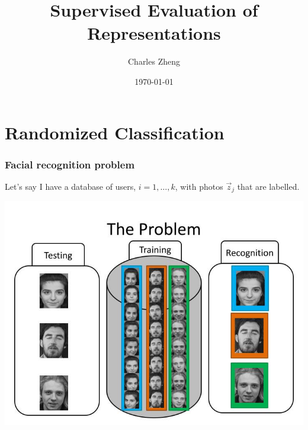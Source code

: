 \documentclass{beamer}
\title[Defense]{Supervised Evaluation of Representations}
\author{Charles Zheng} %
\institute[Stanford] %
{Stanford University}
\date{\today} %
\begin{document}
\begin{frame}
\titlepage %
\end{frame}

\section{Randomized Classification}

\begin{frame}
\sectionpage
\end{frame}


\begin{frame}
\frametitle{Facial recognition problem}
Let's say I have a database of users, $i = 1,\hdots,k$, with photos $\vec{z}_j$ that are labelled.
\begin{center}
\includegraphics[scale = 0.2]{face_rec_the-problem-n.jpg}\pause
\hspace{0.2in}

\end{center}
\end{frame}
\end{document}

